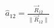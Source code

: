 \documentclass[preview]{standalone}
\begin{document}
\begin{align*}
\hat{a}_{12} = \frac{\vec{R}_{12}}{\|\vec{R}_{12}\|}
\end{align*}
\end{document}
